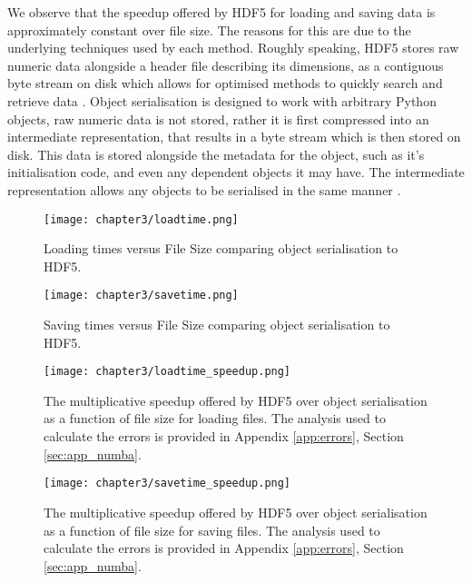 We observe that the speedup offered by HDF5 for loading and saving
data is approximately constant over file size. The reasons for this are due to the underlying
techniques used by each method. Roughly speaking, HDF5 stores raw numeric data
alongside a header file describing its dimensions, as a contiguous byte stream
on disk which allows for optimised methods to quickly search and retrieve data
\cite{collette2013python}. Object serialisation is designed to work with arbitrary
Python objects, raw numeric data is not stored, rather it is first compressed
into an intermediate representation, that results in a byte stream which is then
stored on disk. This data is stored alongside the metadata for the object, such
as it's initialisation code, and even any dependent objects it may have. The
intermediate representation allows any objects to be serialised in the same
manner \cite{pickle}.

\begin{figure}
    \centering

  {\texttt{[image: chapter3/loadtime.png]}}
  \vspace{0pt}
    \caption{
        Loading times versus File Size comparing object serialisation to HDF5.
    }
    \label{fig:3_1_loadtime}
\end{figure}


\begin{figure}
    \centering

  {\texttt{[image: chapter3/savetime.png]}}
  \vspace{0pt}
    \caption{
        Saving times versus File Size comparing object serialisation to HDF5.
    }
    \label{fig:3_1_savetime}
\end{figure}


\begin{figure}
    \centering

  {\texttt{[image: chapter3/loadtime\_speedup.png]}}
  \vspace{0pt}
    \caption{
        The multiplicative speedup offered by HDF5 over object serialisation
        as a function of file size for loading files.
        The analysis used to calculate the errors is provided in
        Appendix \ref{app:errors}, Section \ref{sec:app_numba}.
    }
    \label{fig:3_1_loadtime_speedup}
\end{figure}


\begin{figure}
    \centering

  {\texttt{[image: chapter3/savetime\_speedup.png]}}
  \vspace{0pt}
    \caption{
        The multiplicative speedup offered by HDF5 over object serialisation
        as a function of file size for saving files.
        The analysis used to calculate the errors is provided in
        Appendix \ref{app:errors}, Section \ref{sec:app_numba}.
    }
    \label{fig:3_1_savetime_speedup}
\end{figure}


